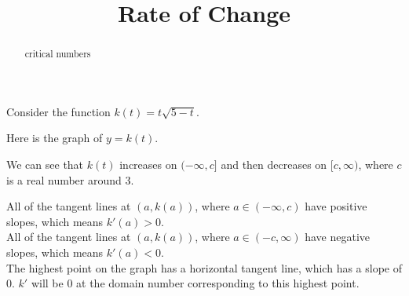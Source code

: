 \documentclass{ximera}
\title{Rate of Change}
\begin{document}
\begin{abstract}
critical numbers
\end{abstract}
\maketitle




Consider the function $k(t) = t \sqrt{5-t}$.

Here is the graph of $y = k(t)$.








\begin{image}
\end{image}





We can see that $k(t)$ increases on $(-\infty, c]$ and then decreases on $[c,\infty)$, where $c$ is a real number around $3$.

All of the tangent lines at $(a, k(a))$, where $a \in (-\infty, c)$ have positive slopes, which means $k'(a) > 0$. \\

All of the tangent lines at $(a, k(a))$, where $a \in (-c, \infty)$ have negative slopes, which means $k'(a) < 0$. \\

The highest point on the graph has a horizontal tangent line, which has a slope of $0$. $k'$ will be $0$ at the domain number corresponding to this highest point.
\end{document}
